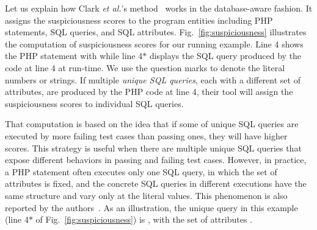 Let us explain how Clark {\em et al.}'s method~\cite{ga-ase11} works
in the database-aware fashion. It assigns the suspiciousness scores to
the program entities including PHP statements, SQL queries, and SQL
attributes.  Fig.~\ref{fig:suspiciousness} illustrates the computation
of suspiciousness scores for our running example. Line 4 shows
the PHP statement with  while line 4$\ast$ displays
the SQL query produced by the code at line 4 at run-time. We use
the question marks to denote the literal numbers or strings.
%
%
If multiple {\em unique SQL queries}, each with a different set of
attributes, are produced by the PHP code at line 4, their tool will assign
the suspiciousness scores to individual SQL queries.


That computation is based on the idea that if some of unique
SQL queries are executed by more failing test cases than passing ones,
they will have higher scores. This strategy is useful when there are
multiple unique SQL queries that expose different behaviors in passing
and failing test cases. However, in practice, a PHP
 statement often executes only one SQL
query, in which the set of attributes is fixed, and the concrete SQL
queries in different executions have the same structure and vary only
at the literal values. This phenomenon is also reported by the
authors~\cite{ga-ase11}. As an illustration, the unique query
in this example (line 4$\ast$ of Fig.~\ref{fig:suspiciousness}) is
, with the set of attributes .

